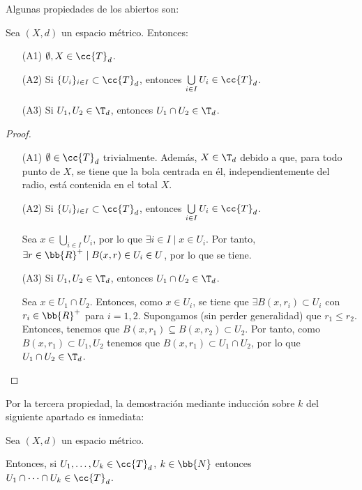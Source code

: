 Algunas propiedades de los abiertos son:
\begin{prop} Sea $(X,d)$ un espacio métrico. Entonces:
    \begin{enumerate}
        \item[(A1)] $\emptyset, X\in \cc{T}_d$.
        \item[(A2)] Si $\{U_i\}_{i\in I}\subset \cc{T}_d$, entonces $ \bigcup\limits_{i\in I} U_i\in \cc{T}_d$.
        \item[(A3)] Si $U_1,U_2\in \T_d$, entonces $U_1\cap U_2\in \T_d$.
    \end{enumerate}
\end{prop}
\begin{proof}\
\begin{enumerate}
        \item[(A1)] $\emptyset\in \cc{T}_d$ trivialmente. Además, $X\in \T_d$ debido a que, para todo punto de $X$, se tiene que la bola centrada en él, independientemente del radio, está contenida en el total $X$.
        
        \item[(A2)] Si $\{U_i\}_{i\in I}\subset \cc{T}_d$, entonces $ \bigcup\limits_{i\in I}U_i \in \cc{T}_d$.

        Sea $x\in \bigcup\limits_{i\in I}U_i$, por lo que $\exists i\in I\mid x\in U_i$. Por tanto, $\exists r\in \bb{R}^+\mid B(x,r)\in U_i\in U$, por lo que se tiene.
        
        \item[(A3)] Si $U_1,U_2\in \T_d$, entonces $U_1\cap U_2\in \T_d$.

        Sea $x\in U_1\cap U_2$. Entonces, como $x\in U_i$, se tiene que $\exists B(x, r_i)\subset U_i$ con $r_i\in \bb{R}^+$ para $i=1,2$. Supongamos (sin perder generalidad) que $r_1\leq r_2$. Entonces, tenemos que $B(x,r_1)\subseteq B(x,r_2)\subset U_2$. Por tanto, como $B(x,r_1)\subset U_1,U_2$ tenemos que $B(x,r_1)\subset U_1\cap U_2$, por lo que $U_1\cap U_2\in \T_d$.
    \end{enumerate}
\end{proof}

Por la tercera propiedad, la demostración mediante inducción sobre $k$ del siguiente apartado es inmediata:
\begin{coro}
    Sea $(X,d)$ un espacio métrico.
    
    Entonces, si $U_1,\dots, U_k \in \cc{T}_d$, $k\in \bb{N}$ entonces $U_1\cap \dots \cap U_k\in \cc{T}_d$.
\end{coro}

